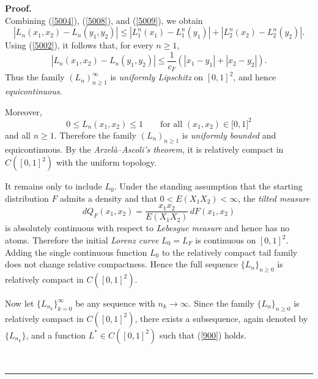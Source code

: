 \documentclass[onecolumn]{article}
\newenvironment{proof}[1][Proof]{\noindent\textbf{#1.} }{\ \rule{0.5em}{0.5em}}
\begin{document}
\begin{proof}
\begin{equation}
\end{equation}%
Combining (\ref{5004}), (\ref{5008}), and (\ref{5009}), we obtain 
\begin{equation}
|L_{n}(x_{1},x_{2})-L_{n}(y_{1},y_{2})|\leq
|L_{1}^{n}(x_{1})-L_{1}^{n}(y_{1})|+|L_{2}^{n}(x_{2})-L_{2}^{n}(y_{2})|.
\label{5010}
\end{equation}%
Using (\ref{5002}), it follows that, for every $n\geq 1$, 
\begin{equation}
|L_{n}(x_{1},x_{2})-L_{n}(y_{1},y_{2})|\leq \frac{1}{c_{F}}\left(
|x_{1}-y_{1}|+|x_{2}-y_{2}|\right) .  \label{5011}
\end{equation}%
Thus the family $(L_{n})_{n\geq 1}^{\infty }$ is \textit{uniformly Lipschitz}
on $[0,1]^{2}$, and hence \textit{equicontinuous}.

Moreover, 
\begin{equation}
0\leq L_{n}(x_{1},x_{2})\leq 1\qquad \text{for all }(x_{1},x_{2})\in \lbrack
0,1]^{2}  \label{5012}
\end{equation}%
and all $n\geq 1$. Therefore the family $(L_{n})_{n\geq 1}$ is \textit{%
uniformly bounded} and equicontinuous. By the \textit{Arzel\`{a}--Ascoli's
theorem}, it is relatively compact in $C([0,1]^{2})$ with the uniform
topology.

\noindent It remains only to include $L_{0}$. Under the standing assumption
that the starting distribution $F$ admits a density and that $%
0<E(X_{1}X_{2})<\infty $, the \textit{tilted measure} 
\begin{equation}
dQ_{F}(x_{1},x_{2})=\frac{x_{1}x_{2}}{E(X_{1}X_{2})}\,dF(x_{1},x_{2})
\label{5013}
\end{equation}%
is absolutely continuous with respect to \textit{Lebesgue measure} and hence
has no atoms. Therefore the initial \textit{Lorenz curve} $L_{0}=L_{F}$ is
continuous on $[0,1]^{2}$. Adding the single continuous function $L_{0}$ to
the relatively compact tail family does not change relative compactness.
Hence the full sequence $\{L_{n}\}_{n\geq 0}$ is relatively compact in $%
C([0,1]^{2})$.

\noindent Now let $\{L_{n_{k}}\}_{k=0}^{\infty }$ be any sequence with $%
n_{k}\rightarrow \infty $. Since the family $\{L_{n}\}_{n\geq 0}$ is
relatively compact in $C([0,1]^{2})$, there exists a subsequence, again
denoted by $\{L_{n_{k}}\}$, and a function $L^{\ast }\in C([0,1]^{2})$ such
that (\ref{900}) holds.


\end{proof}
\end{document}

